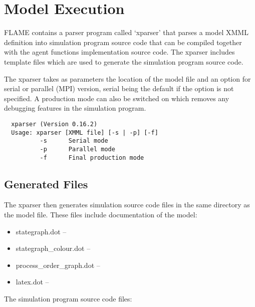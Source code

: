 \section{Model Execution}
\label{sec:model_execution}

FLAME contains a parser program called `xparser' that parses a model
XMML definition into simulation program source code that can be compiled
together with the agent functions implementation source code. The xparser
includes template files which are used to generate the simulation program source code.

The xparser takes as parameters the location of the model file and an option
for serial or parallel (MPI) version, serial being the default if the option is
not specified. A production mode can also be switched on which removes any
debugging features in the simulation program.

\begin{verbatim}
  xparser (Version 0.16.2)
  Usage: xparser [XMML file] [-s | -p] [-f]
          -s      Serial mode
          -p      Parallel mode
          -f      Final production mode
\end{verbatim}

\subsection{Generated Files}

The xparser then generates simulation source code files in the same directory
as the model file. These files include documentation of the model:

\begin{itemize}
  \item stategraph.dot -- 
  \item stategraph_colour.dot --
  \item process_order_graph.dot --
  \item latex.dot --
\end{itemize}

The simulation program source code files:

